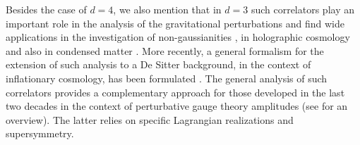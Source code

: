 \documentclass[a4paper,11pt,openright,twoside]{book}
\numberwithin{equation}{section}
\begin{document}
Besides the case of $d=4$, we also mention that in $d=3$ such correlators play an important role in the analysis of the gravitational perturbations and find wide applications in the investigation of non-gaussianities \cite{Maldacena:2011nz}, in holographic cosmology \cite{Bzowski:2011ab,Coriano:2012hd} and also in condensed matter \cite{Chernodub:2017jcp}.
More recently, a general formalism for the extension of such analysis to a De Sitter background, in the context of inflationary cosmology,  has been formulated \cite{Arkani-Hamed:2018kmz,Benincasa:2018ssx,Arkani-Hamed:2018bjr,Arkani-Hamed:2017fdk}.  
The general analysis of such correlators provides a complementary approach for those developed in the last two decades in the context of perturbative gauge theory amplitudes (see \cite{Henn:2014yza,Benincasa:2013faa} for an overview). The latter relies on specific Lagrangian realizations and supersymmetry.
\end{document}
